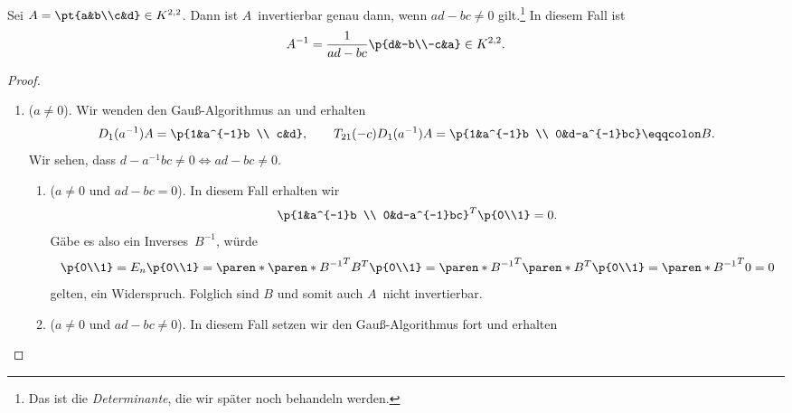 \documentclass[a4paper]{article}
\begin{document}
\begin{proposition}
    Sei $A = \pt{a&b\\c&d} \in K^{2, 2}$. Dann ist $A$~invertierbar genau dann, wenn $ad-bc \neq 0$ gilt.\footnote{Das ist die \emph{Determinante}, die wir später noch behandeln werden.} In diesem Fall ist
    \begin{equation*}
        A^{-1} = \frac{1}{ad-bc} \p{d&-b\\-c&a} \in K^{2, 2}.
    \end{equation*}
\end{proposition}

\begin{proof}\label{prop:2x2inverse}\leavevmode
    \begin{enumerate}[{Fall}~1, leftmargin=*]
        \item ($a \neq 0$). Wir wenden den Gauß-Algorithmus an und erhalten
              \begin{equation*}
                  D_1(a^{-1}) A = \p{1&a^{-1}b \\ c&d}, \qquad T_{21}(-c) D_1(a^{-1}) A = \p{1&a^{-1}b \\ 0&d-a^{-1}bc} \eqqcolon B.
              \end{equation*}
              Wir sehen, dass $d-a^{-1}bc \neq 0 \iff ad-bc \neq 0$.
              \begin{enumerate}[{Fall~2}a, leftmargin=*]
                  \item ($a \neq 0$ und $ad-bc = 0$). In diesem Fall erhalten wir
                        \begin{equation*}
                            \p{1&a^{-1}b \\ 0&d-a^{-1}bc}^T \p{0\\1} = 0.
                        \end{equation*}
                        Gäbe es also ein Inverses~$B^{-1}$, würde
                        \begin{equation*}
                            \p{0\\1} = E_n\p{0\\1} = \paren*{\paren*{B^{-1}}^T B^T} \p{0\\1} = \paren*{B^{-1}}^T \paren*{B^T\p{0\\1}} = \paren*{B^{-1}}^T 0 = 0
                        \end{equation*}
                        gelten, ein Widerspruch. Folglich sind $B$ und somit auch $A$~nicht invertierbar.
                  \item ($a \neq 0$ und $ad-bc \neq 0$). In diesem Fall setzen wir den Gauß-Algorithmus fort und erhalten

\end{enumerate}
\end{enumerate}
\end{proof}
\end{document}
